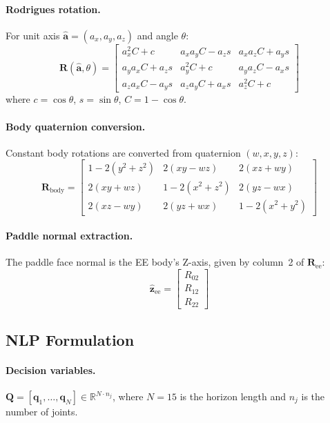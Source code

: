 \documentclass[11pt,letterpaper]{article}
\newcommand{\vv}[1]{\mathbf{#1}}
\begin{document}
\paragraph{Rodrigues rotation.}  For unit axis $\hat{\vv{a}} = (a_x, a_y, a_z)$ and angle $\theta$:
\begin{equation}
    \vv{R}(\hat{\vv{a}}, \theta) = \begin{bmatrix}
    a_x^2 C + c & a_x a_y C - a_z s & a_x a_z C + a_y s \\
    a_y a_x C + a_z s & a_y^2 C + c & a_y a_z C - a_x s \\
    a_z a_x C - a_y s & a_z a_y C + a_x s & a_z^2 C + c
    \end{bmatrix}
\end{equation}
where $c = \cos\theta$, $s = \sin\theta$, $C = 1 - \cos\theta$.

\paragraph{Body quaternion conversion.}  Constant body rotations are converted from quaternion $(w, x, y, z)$:
\begin{equation}
    \vv{R}_{\text{body}} = \begin{bmatrix}
    1-2(y^2+z^2) & 2(xy-wz) & 2(xz+wy) \\
    2(xy+wz) & 1-2(x^2+z^2) & 2(yz-wx) \\
    2(xz-wy) & 2(yz+wx) & 1-2(x^2+y^2)
    \end{bmatrix}
\end{equation}

\paragraph{Paddle normal extraction.}  The paddle face normal is the EE body's Z-axis, given by column~2 of $\vv{R}_{\text{ee}}$:
\begin{equation}
    \hat{\vv{z}}_{\text{ee}} = \begin{bmatrix} R_{02} \\ R_{12} \\ R_{22} \end{bmatrix}
\end{equation}

\subsection{NLP Formulation}

\paragraph{Decision variables.}  $\vv{Q} = [\vv{q}_1, \ldots, \vv{q}_N] \in \mathbb{R}^{N \cdot n_j}$, where $N = 15$ is the horizon length and $n_j$ is the number of joints.
\end{document}
